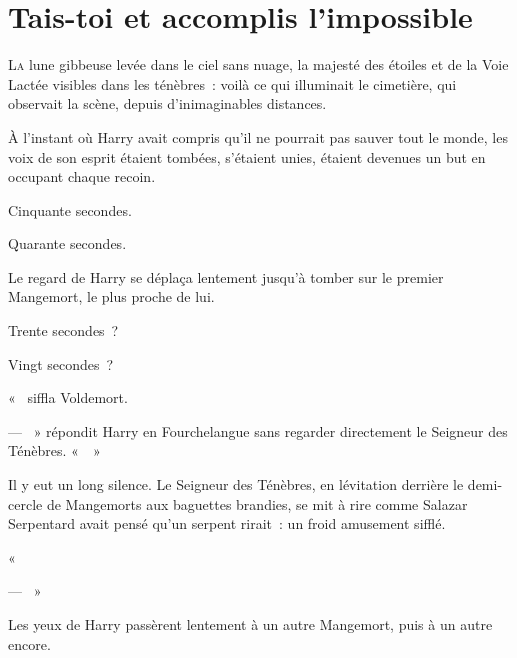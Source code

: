 \chapter{Tais-toi et accomplis l'impossible}

\lettrine{L}{a} lune gibbeuse levée dans le ciel sans nuage, la majesté des étoiles et de la Voie Lactée visibles dans les ténèbres~: voilà ce qui illuminait le cimetière, qui observait la scène, depuis d'inimaginables distances.

À l'instant où Harry avait compris qu'il ne pourrait pas sauver tout le monde, les voix de son esprit étaient tombées, s'étaient unies, étaient devenues un but en occupant chaque recoin.

Cinquante secondes.

Quarante secondes.

Le regard de Harry se déplaça lentement jusqu'à tomber sur le premier Mangemort, le plus proche de lui.

Trente secondes~?

Vingt secondes~?

«~ siffla Voldemort.

--- ~» répondit Harry en Fourchelangue sans regarder directement le Seigneur des Ténèbres.
«~~»

Il y eut un long silence.
Le Seigneur des Ténèbres, en lévitation derrière le demi-cercle de Mangemorts aux baguettes brandies, se mit à rire comme Salazar Serpentard avait pensé qu'un serpent rirait~: un froid amusement sifflé.

«~

--- ~»

Les yeux de Harry passèrent lentement à un autre Mangemort, puis à un autre encore.

